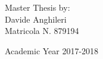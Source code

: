 {\begin{flushleft}
\end{flushleft}
\vspace*{0.9cm}
\begin{flushright}


  Master Thesis by:\\ Davide Anghileri \\ Matricola N. 879194 \\ 
		


\end{flushright}
\vspace*{0.9cm}
\begin{center}



  Academic Year 2017-2018
\end{center} \clearpage
}
